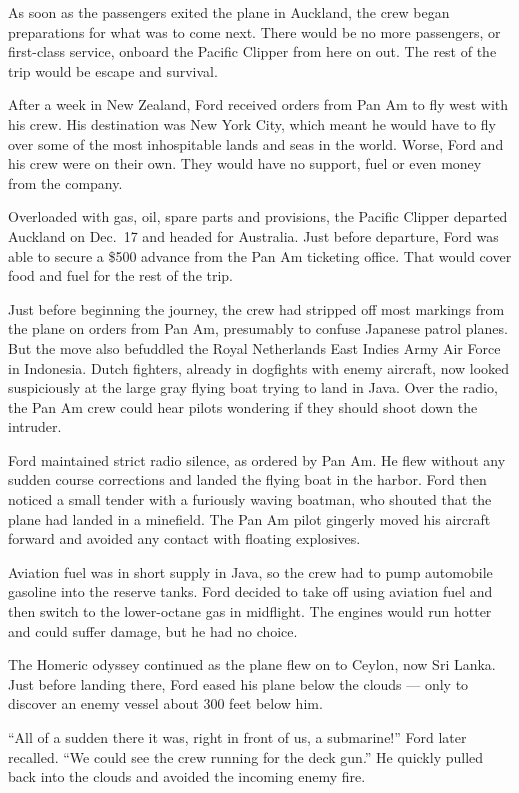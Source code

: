 \documentclass[12pt]{article}
\begin{document}
As soon as the passengers exited the plane in Auckland, the crew began preparations for what was to come next. There would be no more passengers, or first-class service, onboard the Pacific Clipper from here on out. The rest of the trip would be escape and survival.

After a week in New Zealand, Ford received orders from Pan Am to fly west with his crew. His destination was New York City, which meant he would have to fly over some of the most inhospitable lands and seas in the world. Worse, Ford and his crew were on their own. They would have no support, fuel or even money from the company.

Overloaded with gas, oil, spare parts and provisions, the Pacific Clipper departed Auckland on Dec.~17 and headed for Australia. Just before departure, Ford was able to secure a \$500 advance from the Pan Am ticketing office. That would cover food and fuel for the rest of the trip.

Just before beginning the journey, the crew had stripped off most markings from the plane on orders from Pan Am, presumably to confuse Japanese patrol planes. But the move also befuddled the Royal Netherlands East Indies Army Air Force in Indonesia. Dutch fighters, already in dogfights with enemy aircraft, now looked suspiciously at the large gray flying boat trying to land in Java. Over the radio, the Pan Am crew could hear pilots wondering if they should shoot down the intruder.

Ford maintained strict radio silence, as ordered by Pan Am. He flew without any sudden course corrections and landed the flying boat in the harbor. Ford then noticed a small tender with a furiously waving boatman, who shouted that the plane had landed in a minefield. The Pan Am pilot gingerly moved his aircraft forward and avoided any contact with floating explosives.

Aviation fuel was in short supply in Java, so the crew had to pump automobile gasoline into the reserve tanks. Ford decided to take off using aviation fuel and then switch to the lower-octane gas in midflight. The engines would run hotter and could suffer damage, but he had no choice.

The Homeric odyssey continued as the plane flew on to Ceylon, now Sri Lanka. Just before landing there, Ford eased his plane below the clouds --- only to discover an enemy vessel about 300 feet below him.

``All of a sudden there it was, right in front of us, a submarine!'' Ford later recalled. ``We could see the crew running for the deck gun.'' He quickly pulled back into the clouds and avoided the incoming enemy fire.
\end{document}
